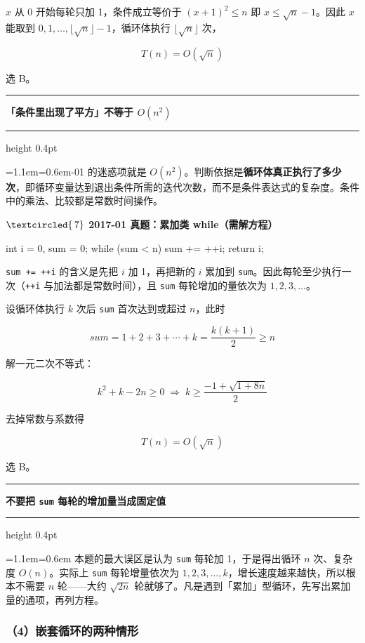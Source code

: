 \documentclass[11pt,openany,UTF8]{ctexbook}
\newcommand{\circled}[1]{\textcircled{\scriptsize\,#1}}
\newcommand{\callouthead}[2]{%
  \par\addvspace{7pt}\noindent
  {\color{#1}\rule[-0.15em]{3pt}{1.05em}}\hspace{0.5em}%
  {\bfseries\color{#1}#2}\par\nobreak\vspace{-0.35em}%
  {\color{rulesep}\hrule height 0.4pt}\nobreak\vspace{0.45em}%
  \begingroup\small\setlength{\parindent}{0pt}%
  \leftskip=1.1em\rightskip=0.6em\noindent\ignorespaces}
\newcommand{\calloutend}{\par\endgroup\addvspace{7pt}}
\newenvironment{callwarn}[1]{\callouthead{warnbar}{#1}}{\calloutend}
\begin{document}
$x$ 从 0 开始每轮只加 1，条件成立等价于 $(x+1)^2 \le n$ 即 $x \le \sqrt{n}-1$。因此 $x$ 能取到 $0,1,\dots,\lfloor\sqrt{n}\rfloor-1$，循环体执行 $\lfloor\sqrt{n}\rfloor$ 次，

\[T(n)=O(\sqrt{n})\]

选 B。

\begin{callwarn}{「条件里出现了平方」不等于 $O(n^2)$}
2019-01 的迷惑项就是 $O(n^2)$。判断依据是\textbf{循环体真正执行了多少次}，即循环变量达到退出条件所需的迭代次数，而不是条件表达式的复杂度。条件中的乘法、比较都是常数时间操作。

\end{callwarn}

\textbf{$\circled{7}$ 2017-01 真题：累加类 while（需解方程）}

\begin{codebox}
int i = 0, sum = 0;
while (sum < n)
    sum += ++i;
return i;
\end{codebox}

\texttt{sum +\allowbreak{}=\allowbreak{} +\allowbreak{}+\allowbreak{}i} 的含义是先把 $i$ 加 1，再把新的 $i$ 累加到 \texttt{sum}。因此每轮至少执行一次（\texttt{+\allowbreak{}+\allowbreak{}i} 与加法都是常数时间），且 \texttt{sum} 每轮增加的量依次为 $1,2,3,\dots$。

设循环体执行 $k$ 次后 \texttt{sum} 首次达到或超过 $n$，此时

\[sum = 1+2+3+\cdots+k = \frac{k(k+1)}{2} \ge n\]

解一元二次不等式：

\[k^2+k-2n \ge 0 \;\Longrightarrow\; k \ge \frac{-1+\sqrt{1+8n}}{2}\]

去掉常数与系数得

\[T(n)=O(\sqrt{n})\]

选 B。

\begin{callwarn}{不要把 \texttt{sum} 每轮的增加量当成固定值}
本题的最大误区是认为 \texttt{sum} 每轮加 1，于是得出循环 $n$ 次、复杂度 $O(n)$。实际上 \texttt{sum} 每轮增量依次为 $1,2,3,\dots,k$，增长速度越来越快，所以根本不需要 $n$ 轮——大约 $\sqrt{2n}$ 轮就够了。凡是遇到「累加」型循环，先写出累加量的通项，再列方程。

\end{callwarn}

\subsubsection{（4）嵌套循环的两种情形}
\end{document}
